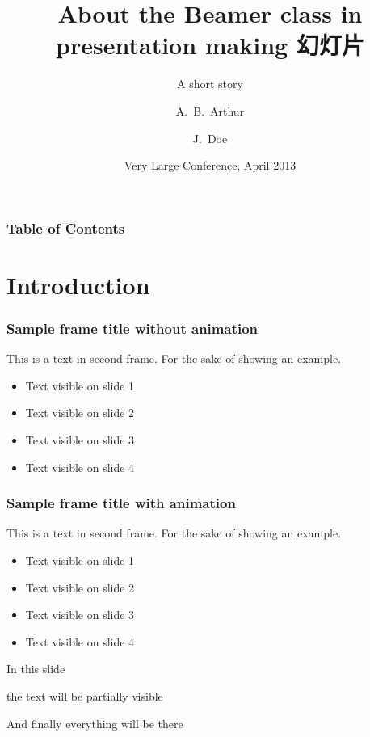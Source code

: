\documentclass[utf8]{beamer}%
\title[About Beamer] %
{About the Beamer class in presentation making 幻灯片}
\subtitle{A short story}
\author[Arthur, Doe] %
{A.~B.~Arthur\inst{1} \and J.~Doe\inst{2}}
\institute[VFU] %
{
	\inst{1}%
	Faculty of Physics\\
	Very Famous University
	\and
	\inst{2}%
	Faculty of Chemistry\\
	Very Famous University
}
\date[VLC 2020] %
{Very Large Conference, April 2013}
\begin{document}
	
	\frame{\titlepage}
	
	\begin{frame}
		\frametitle{Table of Contents}
		\tableofcontents
	\end{frame}
	
	\section{Introduction}
	
	\begin{frame}
		\frametitle{Sample frame title without animation}
		
		This is a text in second frame. For the sake of showing an example.
		
		\begin{itemize}
			\item Text visible on slide 1
			\item Text visible on slide 2
			\item Text visible on slide 3 %
			\item Text visible on slide 4
		\end{itemize}
		
	\end{frame}
	
	\begin{frame}
		\frametitle{Sample frame title with animation}
		This is a text in second frame. For the sake of showing an example.
		
		\begin{itemize}
			\item<1-> Text visible on slide 1
			\item<2-> Text visible on slide 2
			\item<3> Text visible on slide 3 %
			\item<4-> Text visible on slide 4
		\end{itemize}
		
	\end{frame}
	
	
	\begin{frame}
		In this slide \pause
		
		the text will be partially visible \pause
		
		And finally everything will be there
	\end{frame}
	
\end{document}
